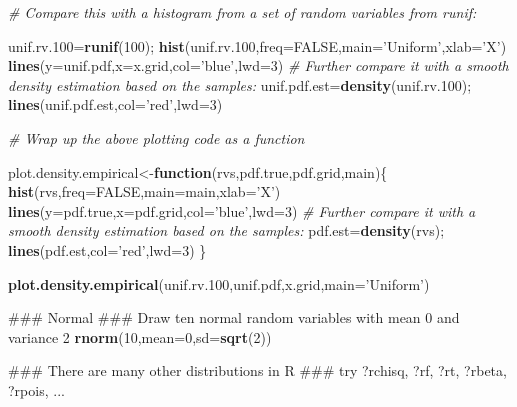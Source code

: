 \documentclass[12pt,]{book}
\newenvironment{Shaded}{\begin{snugshade}}{\end{snugshade}}
\newcommand{\KeywordTok}[1]{\textcolor[rgb]{0.13,0.29,0.53}{\textbf{#1}}}
\newcommand{\DataTypeTok}[1]{\textcolor[rgb]{0.13,0.29,0.53}{#1}}
\newcommand{\DecValTok}[1]{\textcolor[rgb]{0.00,0.00,0.81}{#1}}
\newcommand{\StringTok}[1]{\textcolor[rgb]{0.31,0.60,0.02}{#1}}
\newcommand{\CommentTok}[1]{\textcolor[rgb]{0.56,0.35,0.01}{\textit{#1}}}
\newcommand{\OtherTok}[1]{\textcolor[rgb]{0.56,0.35,0.01}{#1}}
\newcommand{\ControlFlowTok}[1]{\textcolor[rgb]{0.13,0.29,0.53}{\textbf{#1}}}
\newcommand{\NormalTok}[1]{#1}
\begin{document}
\begin{Shaded}
\begin{Highlighting}[]
\CommentTok{# Compare this with a histogram from a set of random variables from runif:}

\NormalTok{unif.rv.}\DecValTok{100}\NormalTok{=}\KeywordTok{runif}\NormalTok{(}\DecValTok{100}\NormalTok{);}
\KeywordTok{hist}\NormalTok{(unif.rv.}\DecValTok{100}\NormalTok{,}\DataTypeTok{freq=}\OtherTok{FALSE}\NormalTok{,}\DataTypeTok{main=}\StringTok{'Uniform'}\NormalTok{,}\DataTypeTok{xlab=}\StringTok{'X'}\NormalTok{)}
\KeywordTok{lines}\NormalTok{(}\DataTypeTok{y=}\NormalTok{unif.pdf,}\DataTypeTok{x=}\NormalTok{x.grid,}\DataTypeTok{col=}\StringTok{'blue'}\NormalTok{,}\DataTypeTok{lwd=}\DecValTok{3}\NormalTok{)}
\CommentTok{# Further compare it with a smooth density estimation based on the samples:}
\NormalTok{unif.pdf.est=}\KeywordTok{density}\NormalTok{(unif.rv.}\DecValTok{100}\NormalTok{);}
\KeywordTok{lines}\NormalTok{(unif.pdf.est,}\DataTypeTok{col=}\StringTok{'red'}\NormalTok{,}\DataTypeTok{lwd=}\DecValTok{3}\NormalTok{)}
\end{Highlighting}
\end{Shaded}

\begin{Shaded}
\begin{Highlighting}[]
\CommentTok{# Wrap up the above plotting code as a function }

\NormalTok{plot.density.empirical<-}\ControlFlowTok{function}\NormalTok{(rvs,pdf.true,pdf.grid,main)\{}
\KeywordTok{hist}\NormalTok{(rvs,}\DataTypeTok{freq=}\OtherTok{FALSE}\NormalTok{,}\DataTypeTok{main=}\NormalTok{main,}\DataTypeTok{xlab=}\StringTok{'X'}\NormalTok{)}
\KeywordTok{lines}\NormalTok{(}\DataTypeTok{y=}\NormalTok{pdf.true,}\DataTypeTok{x=}\NormalTok{pdf.grid,}\DataTypeTok{col=}\StringTok{'blue'}\NormalTok{,}\DataTypeTok{lwd=}\DecValTok{3}\NormalTok{)}
\CommentTok{# Further compare it with a smooth density estimation based on the samples:}
\NormalTok{pdf.est=}\KeywordTok{density}\NormalTok{(rvs);}
\KeywordTok{lines}\NormalTok{(pdf.est,}\DataTypeTok{col=}\StringTok{'red'}\NormalTok{,}\DataTypeTok{lwd=}\DecValTok{3}\NormalTok{)}
\NormalTok{\}}


\KeywordTok{plot.density.empirical}\NormalTok{(unif.rv.}\DecValTok{100}\NormalTok{,unif.pdf,x.grid,}\DataTypeTok{main=}\StringTok{'Uniform'}\NormalTok{)}
\end{Highlighting}
\end{Shaded}

\begin{Shaded}
\begin{Highlighting}[]
\NormalTok{### Normal}
\NormalTok{### Draw ten normal random variables with mean 0 and variance 2}
\KeywordTok{rnorm}\NormalTok{(}\DecValTok{10}\NormalTok{,}\DataTypeTok{mean=}\DecValTok{0}\NormalTok{,}\DataTypeTok{sd=}\KeywordTok{sqrt}\NormalTok{(}\DecValTok{2}\NormalTok{))}

\NormalTok{### There are many other distributions in R}
\NormalTok{### try ?rchisq, ?rf, ?rt, ?rbeta, ?rpois, ...}
\end{Highlighting}
\end{Shaded}
\end{document}
